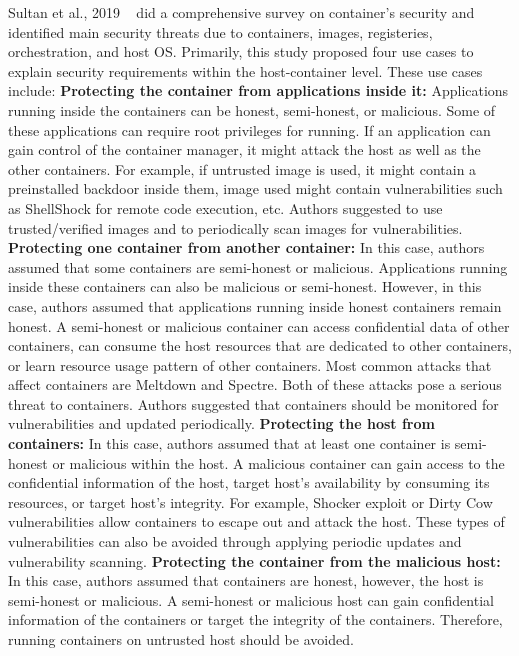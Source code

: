 Sultan et al., 2019 ~\cite{sultan2019container} did a comprehensive
survey on container's security and identified main security threats
due to containers, images, registeries, orchestration, and host OS.
Primarily, this study proposed four use cases to explain security
requirements within the host-container level.
These use cases include: 
\newline
\newline
\textbf{Protecting the container from applications inside it:}
Applications running inside the containers can be honest, semi-honest,
or malicious. Some of these applications can require root
privileges for running. If an application can gain control
of the container manager, it might attack the host as well as
the other containers. For example, if untrusted image is
used, it might contain a preinstalled backdoor
inside them, image used might contain vulnerabilities such as
ShellShock for remote code execution, etc.
Authors suggested to use trusted/verified images and
to periodically scan images for vulnerabilities.
\newline
\newline
\textbf{Protecting one container from another container:}
In this case, authors assumed that some containers are semi-honest or
malicious. Applications running inside these
containers can also be malicious or semi-honest. However,
in this case, authors assumed that applications running
inside honest containers remain honest. A semi-honest or
malicious
container can access confidential data of other
containers, can consume the host resources that are dedicated
to other containers, or learn resource usage pattern of other
containers. Most common attacks that affect
containers are Meltdown and Spectre. Both of these attacks
pose a serious threat to containers.
Authors suggested that containers should be
monitored for vulnerabilities and updated
periodically.
\newline
\newline
\textbf{Protecting the host from containers:}
In this case, authors assumed that at least one
container is semi-honest or malicious within
the host. A malicious container can gain
access to the confidential information of the host, target
host's availability by consuming its resources, or target host's
integrity. For example, Shocker exploit or Dirty Cow
vulnerabilities allow containers to escape out
and attack the host.
These types of vulnerabilities can also be avoided
through applying periodic updates and vulnerability scanning.
\newline
\newline
\textbf{Protecting the container from the malicious host:}
In this case, authors assumed that containers are honest,
however, the host is semi-honest or malicious. A semi-honest
or malicious host can gain confidential information of the
containers or target the integrity of the containers.
Therefore, running containers on untrusted
host should be avoided.

